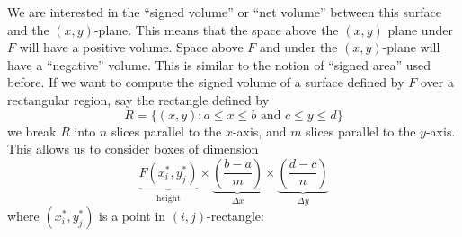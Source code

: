 \documentclass{ximera}
\begin{document}
We are interested in the ``signed volume'' or ``net volume'' between
this surface and the $(x,y)$-plane. This means that the space above
the $(x,y)$ plane under $F$ will have a positive volume.  Space above
$F$ and under the $(x,y)$-plane will have a ``negative'' volume. This
is similar to the notion of ``signed area'' used before.  If we want
to compute the signed volume of a surface defined by $F$ over a
rectangular region, say the rectangle defined by
\[
R = \{(x,y):\text{$a\le x\le b$ and $c\le y\le d$}\}
\]
we break $R$ into $n$ slices parallel to the $x$-axis, and $m$ slices
parallel to the $y$-axis. This allows us to consider boxes of
dimension
\[
\underbrace{F(x_i^*,y_j^*)}_{\text{height}}\times\underbrace{\left(\frac{b-a}{m}\right)}_{\Delta x}\times \underbrace{\left(\frac{d-c}{n}\right)}_{\Delta y}
\]
where $(x_i^*,y_j^*)$ is a point in $(i,j)$-rectangle:
\end{document}
